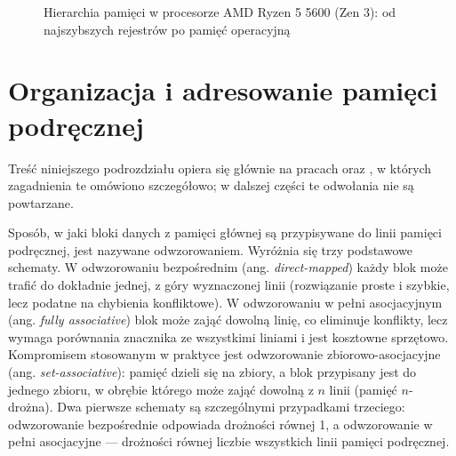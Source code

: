 \documentclass[a4paper,12pt]{book} %
\begin{document}
\begin{figure}[t!]
\centering
{}
\caption{Hierarchia pamięci w procesorze AMD Ryzen 5 5600 (Zen 3): od najszybszych rejestrów po pamięć operacyjną}
\label{rys:hierarchia}
\end{figure}

\section{Organizacja i adresowanie pamięci podręcznej}
\label{sec:organizacja}

Treść niniejszego podrozdziału opiera się głównie na pracach \cite{hennessy2017architecture} oraz \cite{gottlieb_arch_lec22}, w których zagadnienia te omówiono szczegółowo; w dalszej części te odwołania nie są powtarzane.

Sposób, w jaki bloki danych z pamięci głównej są przypisywane do linii pamięci podręcznej, jest nazywane odwzorowaniem. Wyróżnia się trzy podstawowe schematy. W odwzorowaniu bezpośrednim (ang. \emph{direct-mapped}) każdy blok może trafić do dokładnie jednej, z góry wyznaczonej linii (rozwiązanie proste i szybkie, lecz podatne na chybienia konfliktowe). W odwzorowaniu w pełni asocjacyjnym (ang. \emph{fully associative}) blok może zająć dowolną linię, co eliminuje konflikty, lecz wymaga porównania znacznika ze wszystkimi liniami i jest kosztowne sprzętowo. Kompromisem stosowanym w praktyce jest odwzorowanie zbiorowo-asocjacyjne (ang. \emph{set-associative}): pamięć dzieli się na zbiory, a blok przypisany jest do jednego zbioru, w obrębie którego może zająć dowolną z $n$ linii (pamięć $n$-drożna). Dwa pierwsze schematy są szczególnymi przypadkami trzeciego: odwzorowanie bezpośrednie odpowiada drożności równej 1, a odwzorowanie w pełni asocjacyjne --- drożności równej liczbie wszystkich linii pamięci podręcznej.
\end{document}
